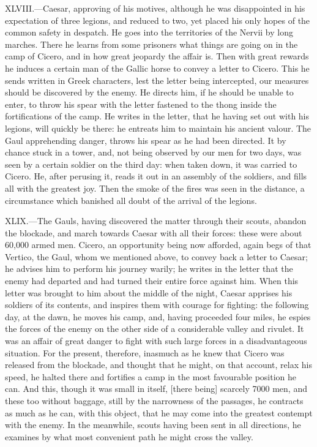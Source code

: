 XLVIII.—Caesar, approving of his motives, although he was disappointed
in his expectation of three legions, and reduced to two, yet placed his
only hopes of the common safety in despatch. He goes into the
territories of the Nervii by long marches. There he learns from some
prisoners what things are going on in the camp of Cicero, and in how
great jeopardy the affair is. Then with great rewards he induces a
certain man of the Gallic horse to convey a letter to Cicero. This he
sends written in Greek characters, lest the letter being intercepted,
our measures should be discovered by the enemy. He directs him, if he
should be unable to enter, to throw his spear with the letter fastened
to the thong inside the fortifications of the camp. He writes in the
letter, that he having set out with his legions, will quickly be there:
he entreats him to maintain his ancient valour. The Gaul apprehending
danger, throws his spear as he had been directed. It by chance stuck in
a tower, and, not being observed by our men for two days, was seen by a
certain soldier on the third day: when taken down, it was carried to
Cicero. He, after perusing it, reads it out in an assembly of the
soldiers, and fills all with the greatest joy. Then the smoke of the
fires was seen in the distance, a circumstance which banished all doubt
of the arrival of the legions.

XLIX.—The Gauls, having discovered the matter through their scouts,
abandon the blockade, and march towards Caesar with all their forces:
these were about 60,000 armed men. Cicero, an opportunity being now
afforded, again begs of that Vertico, the Gaul, whom we mentioned above,
to convey back a letter to Caesar; he advises him to perform his journey
warily; he writes in the letter that the enemy had departed and had
turned their entire force against him. When this letter was brought to
him about the middle of the night, Caesar apprises his soldiers of its
contents, and inspires them with courage for fighting: the following
day, at the dawn, he moves his camp, and, having proceeded four miles,
he espies the forces of the enemy on the other side of a considerable
valley and rivulet. It was an affair of great danger to fight with such
large forces in a disadvantageous situation. For the present, therefore,
inasmuch as he knew that Cicero was released from the blockade, and
thought that he might, on that account, relax his speed, he halted there
and fortifies a camp in the most favourable position he can. And this,
though it was small in itself, [there being] scarcely 7000 men, and
these too without baggage, still by the narrowness of the passages, he
contracts as much as he can, with this object, that he may come into the
greatest contempt with the enemy. In the meanwhile, scouts having been
sent in all directions, he examines by what most convenient path he
might cross the valley.

